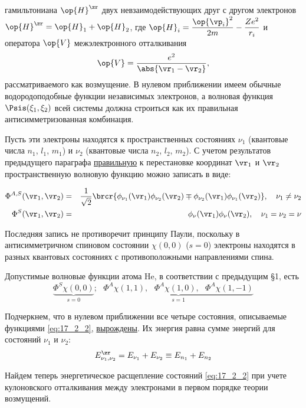 гамильтониана $\op{H}^\zr$ двух невзаимодействующих друг с другом электронов $\op{H}^\zr = \op{H}_1 + \op{H}_2$, где $\op{H}_i = \dfrac{\op{\vp_i}^2}{2m} - \dfrac{Ze^2}{r_i}$ и оператора $\op{V}$ межэлектронного отталкивания
$$
\op{V} = \frac{e^2}{\abs{\vr_1 - \vr_2}},
$$
рассматриваемого как возмущение. В нулевом приближении имеем обычные водородоподобные функции независимых электронов, а волновая функция $\Psis(\xi_1, \xi_2)$ всей системы должна строиться как их правильная антисимметризованная комбинация.

Пусть эти электроны находятся к пространственных состояниях $\nu_1$ (квантовые числа $n_1$, $l_1$, $m_1$) и $\nu_2$ (квантовые числа $n_2$, $l_2$, $m_2$). С учетом результатов предыдущего параграфа \underline{правильную} к перестановке координат $\vr_1$ и $\vr_2$ пространственную волновую функцию можно записать в виде:



\begin{eqnarray}
\label{eq:17_2_1}
\Phi^{A, S}(\vr_1, \vr_2) &=& \frac{1}{\sqrt{2}}\brcr{\phi_{\nu_1}(\vr_1) \phi_{\nu_2}(\vr_2) \mp \phi_{\nu_2}(\vr_1) \phi_{\nu_1}(\vr_2)}, ~~~\nu_1 \neq \nu_2 \nonumber \\
\Phi^S(\vr_1, \vr_2) &=& \phi_{\nu}(\vr_1) \phi_{\nu}(\vr_2), ~~~\nu_1 = \nu_2= \nu
\end{eqnarray}

Последняя запись не противоречит принципу Паули, поскольку в антисимметричном спиновом состоянии $\chi(0, 0)$ ($s=0$) электроны находятся в разных квантовых состояниях с противоположными направлениями спина.

Допустимые волновые функции атома He, в соответствии с предыдущим \S 1, есть
\begin{equation}
\label{eq:17_2_2}
\underbrace{\Phi^S \chi(0, 0)}_{s = 0};~~~\underbrace{\Phi^A \chi(1,1),~~~\Phi^A \chi(1,0),~~~\Phi^A \chi(1,-1)}_{s = 1}
\end{equation}

Подчеркнем, что в нулевом приближении все четыре состояния, описываемые функциями \eqref{eq:17_2_2}, \underline{вырождены}. Их энергия равна сумме энергий для состояний $\nu_1$ и $\nu_2$:
$$
E_{\nu_1, \nu_2}^\zr = E_{\nu_1} + E_{\nu_2} \equiv E_{n_1} + E_{n_2}
$$

Найдем теперь энергетическое расщепление состояний \eqref{eq:17_2_2} при учете кулоновского отталкивания между электронами в первом порядке теории возмущений.

